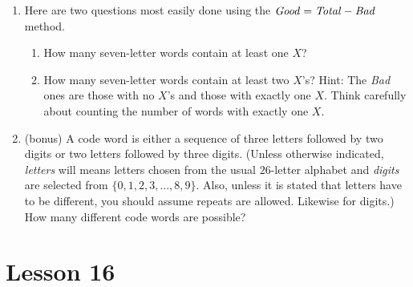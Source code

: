 \documentclass[11pt]{amsart}
\begin{document}
\begin{enumerate}
\item Here are two questions most easily done using the $\it Good = Total - Bad$ method.\\[3pt]
\begin{enumerate}
\item How many seven-letter words contain at least one $X$?\\[3pt]
\item How many seven-letter words contain at least two $X$'s?
Hint: The {\it Bad} ones are those with no $X$'s and those with exactly one $X$. 
Think carefully about counting the number of words with exactly one $X$.\\[5pt]
\end{enumerate}

\item (bonus) A code word is either a sequence of three letters followed
by two digits or two letters followed by three digits. (Unless otherwise
indicated, {\it letters} will means
 letters chosen from the usual
$26$-letter alphabet and {\it digits} are selected from 
$\{0,1,2,3,\dots,8,9\}$. Also, unless it is stated that letters have to be different, you should assume repeats are allowed. Likewise for digits.) How many different code words are possible?\\[5pt]



\end{enumerate}

\section{Lesson 16}
\end{document}
